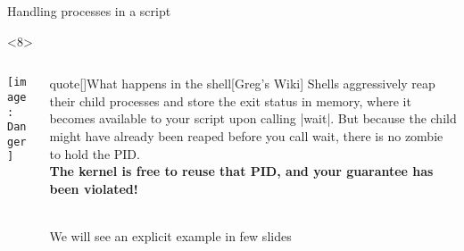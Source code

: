 \begin{frame}{Handling processes in a script}
\begin{overlayarea}{\textwidth}{0.7\textheight}
        \begin{onlyenv}<8>
            \vspace{-2mm}
            \begin{columns}[c]
                \begin{column}{0.25\textwidth}
                    \centering\texttt{[image: Danger]}
                \end{column}
                \begin{column}{0.7\textwidth}
                    \begin{varblock}{quote}[\textwidth]{What happens in the shell}[Greg's Wiki]
                        Shells aggressively reap their child processes and store the exit status in memory, where it becomes available to your script upon calling \textnormal{\bash|wait|}.
                        But because the child might have already been reaped before you call wait, there is no zombie to hold the PID.\\
                        \alert{\textbf{The kernel is free to reuse that PID, and your guarantee has been violated!}}\\[-1.5ex] ~
                    \end{varblock}
                    \vspace{-3mm}
                    \centering\tiny We will see an explicit example in few slides
                \end{column}
            \end{columns}
        \end{onlyenv}
    \end{overlayarea}
\end{frame}
